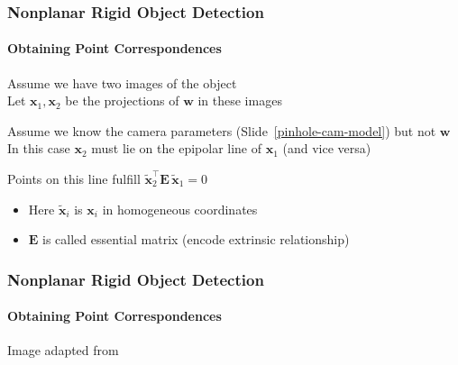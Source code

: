 \documentclass[xetex,professionalfont]{beamer}
\renewcommand{\vec}[1]{\ensuremath{\mathbf{#1}}}
\newcommand{\vw}{\vec{w}}
\newcommand{\vx}{\vec{x}}
\newcommand{\vE}{\vec{E}}
\renewcommand\emph[1]{\textcolor{tuwcvl_inf_red}{#1}}
\begin{document}

\begin{frame}
\frametitle{Nonplanar Rigid Object Detection}
\framesubtitle{Obtaining Point Correspondences}

Assume we have two images of the object \\
Let $\vx_1,\vx_2$ be the projections of $\vw$ in these images

\bigskip
Assume we know the camera parameters (Slide~\ref{pinhole-cam-model}) but not $\vw$ \\ %
In this case $\vx_2$ must lie on the \emph{epipolar line} of $\vx_1$ (and vice versa)

\bigskip
Points on this line fulfill $\tilde{\vx}_2^\top\vE\,\tilde{\vx}_1=0$
\begin{itemize}
    \item Here $\tilde{\vx}_i$ is $\vx_i$ in homogeneous coordinates
    \item $\vE$ is called \emph{essential matrix} (encode extrinsic relationship)
\end{itemize}

\end{frame}


\begin{frame}
\frametitle{Nonplanar Rigid Object Detection}
\framesubtitle{Obtaining Point Correspondences}

\begin{center}
    {\centering Image adapted from \cite{prince12}}
\end{center}

\end{frame}

\end{document}

